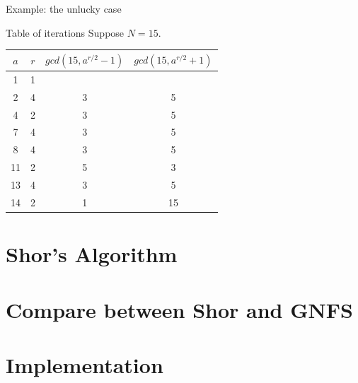 \documentclass{beamer}
\begin{document}
    \begin{frame}{Example: the unlucky case}
        \begin{exampleblock}{Table of iterations}
            Suppose $N = 15$.
            \begin{center}
                \begin{tabular}{ |c|c|c|c| } 
                    \hline
                    $a$ & $r$ & $gcd(15, a^{r/2} - 1)$ & $gcd(15, a^{r/2} + 1)$ \\ 
                    \hline
                    1 & 1 & & \\ 
                    \hline
                    2 & 4 & 3 & 5 \\ 
                    \hline
                    4 & 2 & 3 & 5 \\
                    \hline
                    7 & 4 & 3 & 5 \\
                    \hline
                    8 & 4 & 3 & 5 \\
                    \hline
                    11 & 2 & 5 & 3 \\
                    \hline
                    13 & 4 & 3 & 5 \\
                    \hline
                    \rowcolor{orangered} 14 & 2 & 1 & 15 \\
                    \hline
                \end{tabular}
            \end{center}
        \end{exampleblock}
    \end{frame}

    \section{Shor's Algorithm}

    \section{Compare between Shor and GNFS}

    \section{Implementation}
    
    
\end{document}
